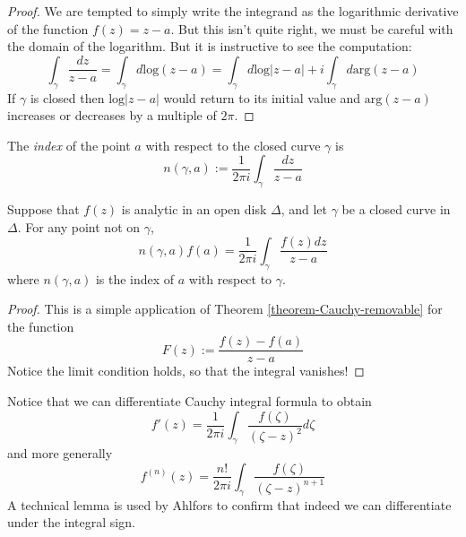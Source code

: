 \begin{proof}
We are tempted to simply write the integrand as the logarithmic derivative of
the function $f(z)=z-a$. But this isn't quite right, we must be careful with the
domain of the logarithm. But it is instructive to see the computation:
$$
\int_\gamma\frac{dz}{z-a}=\int_\gamma d \text{log}(z-a)=
\int_\gamma d\text{log}|z-a|+i\int_\gamma d \text{arg}(z-a)
$$
If  $\gamma$ is closed then $\text{log}|z-a|$ would return to its initial value
and $\text{arg}(z-a)$ increases or decreases by a multiple of $2\pi$.
\end{proof}

\begin{definition}
\label{definition-index}
The {\it index} of the point $a$ with respect to the closed curve $\gamma$ is
\begin{equation}
\label{equation-index}
n(\gamma,a):=\frac{1}{2\pi i}\int_\gamma\frac{dz}{z-a}
\end{equation}
\end{definition}

\begin{theorem}
\label{theorem-Cauchy-integral-formula}
\begin{reference}
\cite[Section 2.2, Theorem 6]{ahl}
\end{reference}
Suppose that $f(z)$ is analytic in an open disk $\Delta$, and let $\gamma$ be a
closed curve in $\Delta$. For any point not on $\gamma$,
\begin{equation}
\label{equation-Cauchy-formula-with-index}
n(\gamma,a)f(a)=\frac{1}{2\pi i}\int_\gamma\frac{f(z)dz}{z-a}
\end{equation}
where $n(\gamma,a)$ is the index of $a$ with respect to $\gamma$.
\end{theorem}

\begin{proof}
This is a simple application of Theorem \ref{theorem-Cauchy-removable} for the
function
$$
F(z):=\frac{f(z)-f(a)}{z-a}
$$
Notice the limit condition holds, so that the integral vanishes!
\end{proof}

Notice that we can differentiate Cauchy integral formula to obtain
\begin{equation}
\label{equation-first-derivative-Cauchy-formula}
f'(z)=\frac{1}{2\pi i}\int_\gamma\frac{f(\zeta)}{(\zeta-z)^2}d\zeta
\end{equation}
and more generally
$$
f^{(n)}(z)=\frac{n!}{2\pi i}\int_\gamma \frac{f(\zeta)}{(\zeta-z)^{n+1}}
$$
A technical lemma is used by Ahlfors to confirm that indeed we can differentiate
under the integral sign.

